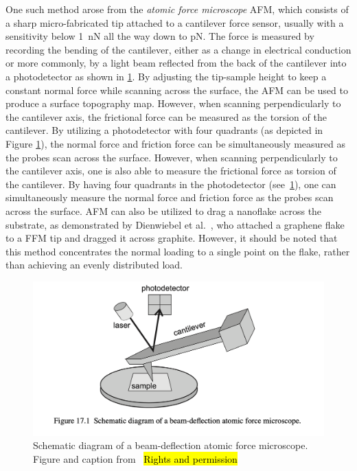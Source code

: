 One such method arose from the \textit{atomic force microscope} \acrshort{AFM}, which consists of a sharp micro-fabricated tip attached to a cantilever force sensor, usually with a sensitivity below \SI{1}{nN} all the way down to pN. The force is measured by recording the bending of
the cantilever, either as a change in electrical conduction or more commonly, by
a light beam reflected from the back of the cantilever into a photodetector
\cite[p. 183]{gnecco_meyer_2015} as shown in \cref{fig:AFM}. By adjusting the tip-sample height to keep a constant normal force while scanning across the surface, the \acrshort{AFM} can be used to produce a
surface topography map.  However, when scanning perpendicularly to the cantilever axis, the frictional force can be measured as the torsion of the cantilever. By utilizing a photodetector with four quadrants (as depicted in Figure \ref{fig:AFM}), the normal force and friction force can be simultaneously measured as the probes scan across the surface. However, when scanning
perpendicularly to the cantilever axis, one is also able to measure the
frictional force as torsion of the cantilever. By having four quadrants in the
photodetector (see~\cref{fig:AFM}), one can simultaneously
measure the normal force and friction force as the probes scan across the
surface. \acrshort{AFM} can also be utilized to drag a nanoflake across the substrate, as demonstrated by Dienwiebel et al.~\cite{DIENWIEBEL2005197}, who attached a graphene flake to a \acrshort{FFM} tip and dragged it across graphite. However, it should be noted that this method concentrates the normal loading to a single point on the flake, rather than achieving an evenly distributed load.

\begin{figure}[H]
  \centering
  \includegraphics[width=0.6\linewidth]{figures/theory/AFM.png}
  \caption{Schematic diagram of a beam-deflection atomic force microscope. Figure and caption from~\cite[p. 184]{gnecco_meyer_2015} \hl{Rights and permission}}
  \label{fig:AFM}
\end{figure}




